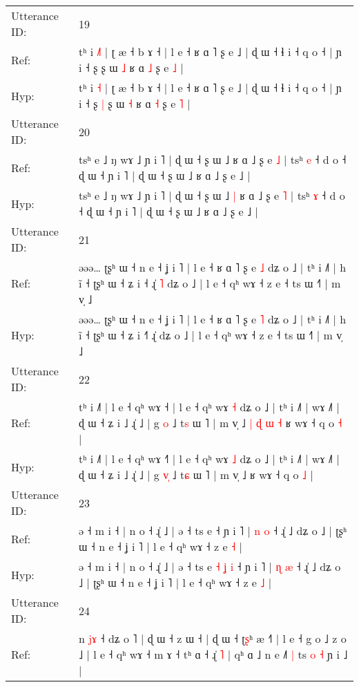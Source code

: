 \documentclass[10pt]{article}
\DeclareRobustCommand{\hl}[1]{{\textcolor{red}{#1}}}
\begin{document}
\begin{longtable}{ll}
\midrule
Utterance ID: & 19 \\
Ref: & tʰ i \hl{˩}\hl{˥} | ʈ æ ˧ b ɤ ˧ | l e ˧ ʁ ɑ ˥ ʂ e ˩ | ɖ ɯ ˧ ɬ i ˧ q o ˧ | ɲ i ˧ ʂ\hl{}\hl{} ʂ ɯ \hl{˩} ʁ ɑ \hl{˩} ʂ e \hl{˩} |
 \\
Hyp: & tʰ i \hl{}\hl{˧} | ʈ æ ˧ b ɤ ˧ | l e ˧ ʁ ɑ ˥ ʂ e ˩ | ɖ ɯ ˧ ɬ i ˧ q o ˧ | ɲ i ˧ ʂ\hl{ }\hl{|} ʂ ɯ \hl{˧} ʁ ɑ \hl{˧} ʂ e \hl{˥} |
 \\
\midrule
Utterance ID: & 20 \\
Ref: & tsʰ e ˩ ŋ wɤ ˩ ɲ i ˥ | ɖ ɯ ˧ ʂ ɯ ˩\hl{}\hl{} ʁ ɑ ˩ ʂ e \hl{˩} | tsʰ \hl{e} ˧ d o ˧ ɖ ɯ ˧ ɲ i ˥ | ɖ ɯ ˧ ʂ ɯ ˩ ʁ ɑ ˩ ʂ e ˩ |
 \\
Hyp: & tsʰ e ˩ ŋ wɤ ˩ ɲ i ˥ | ɖ ɯ ˧ ʂ ɯ ˩\hl{ }\hl{|} ʁ ɑ ˩ ʂ e \hl{˥} | tsʰ \hl{ɤ} ˧ d o ˧ ɖ ɯ ˧ ɲ i ˥ | ɖ ɯ ˧ ʂ ɯ ˩ ʁ ɑ ˩ ʂ e ˩ |
 \\
\midrule
Utterance ID: & 21 \\
Ref: & əəə… ʈʂʰ ɯ ˧ n e ˧ ʝ i ˥ | l e ˧ ʁ ɑ ˥ ʂ e \hl{˩} dʑ o ˩ | tʰ i ˩˥ | h ĩ ˧ ʈʂʰ ɯ ˧ ʑ i ˧\hl{} ɻ̍\hl{ }\hl{˥} dʑ o ˩ | l e ˧ qʰ wɤ ˧ z e ˧ ts ɯ ˧˥ | m v̩ ˩
 \\
Hyp: & əəə… ʈʂʰ ɯ ˧ n e ˧ ʝ i ˥ | l e ˧ ʁ ɑ ˥ ʂ e \hl{˥} dʑ o ˩ | tʰ i ˩˥ | h ĩ ˧ ʈʂʰ ɯ ˧ ʑ i ˧\hl{˥} ɻ̍\hl{}\hl{} dʑ o ˩ | l e ˧ qʰ wɤ ˧ z e ˧ ts ɯ ˧˥ | m v̩ ˩
 \\
\midrule
Utterance ID: & 22 \\
Ref: & tʰ i ˩˥ | l e ˧ qʰ wɤ ˧\hl{} | l e ˧ qʰ wɤ \hl{˧} dʑ o ˩ | tʰ i ˩˥ | wɤ ˩˥ | ɖ ɯ ˧ ʑ i ˩ ɻ̍ ˩ | g \hl{}\hl{o} ˩ t\hl{s} ɯ ˥ | m v̩ ˩\hl{ }\hl{|}\hl{ }\hl{ɖ}\hl{ }\hl{ɯ}\hl{ }\hl{˧} ʁ wɤ ˧ q o \hl{˧} |
 \\
Hyp: & tʰ i ˩˥ | l e ˧ qʰ wɤ ˧\hl{˥} | l e ˧ qʰ wɤ \hl{˩} dʑ o ˩ | tʰ i ˩˥ | wɤ ˩˥ | ɖ ɯ ˧ ʑ i ˩ ɻ̍ ˩ | g \hl{v}\hl{̩} ˩ t\hl{ɕ} ɯ ˥ | m v̩ ˩\hl{}\hl{}\hl{}\hl{}\hl{}\hl{}\hl{}\hl{} ʁ wɤ ˧ q o \hl{˩} |
 \\
\midrule
Utterance ID: & 23 \\
Ref: & ə ˧ m i ˧ | n o ˧ ɻ̍ ˩ | ə ˧ ts e\hl{}\hl{}\hl{}\hl{}\hl{}\hl{} ˧ ɲ i ˥ | \hl{n} \hl{o} ˧ ɻ̍ ˩ dʑ o ˩ | ʈʂʰ ɯ ˧ n e ˧ ʝ i ˥ | l e ˧ qʰ wɤ ˧ z e \hl{˧} |
 \\
Hyp: & ə ˧ m i ˧ | n o ˧ ɻ̍ ˩ | ə ˧ ts e\hl{ }\hl{˧}\hl{ }\hl{ʝ}\hl{ }\hl{i} ˧ ɲ i ˥ | \hl{ɳ} \hl{æ} ˧ ɻ̍ ˩ dʑ o ˩ | ʈʂʰ ɯ ˧ n e ˧ ʝ i ˥ | l e ˧ qʰ wɤ ˧ z e \hl{˩} |
 \\
\midrule
Utterance ID: & 24 \\
Ref: & n \hl{j}\hl{ɤ} ˧ dʑ o ˥ | ɖ ɯ ˧ z ɯ ˧ | ɖ ɯ ˧ ʈ\hl{ʂ}ʰ æ ˧\hl{˥} | l e ˧ g o ˩ z o ˩ | l e ˧ qʰ wɤ ˧\hl{}\hl{} m ɤ ˧ tʰ ɑ ˧\hl{} ɻ̍\hl{ }\hl{˥} | qʰ ɑ ˩ n e ˩˥\hl{ }\hl{|} ts \hl{o} \hl{˧} ɲ i ˩ |

\end{longtable}
\end{document}
